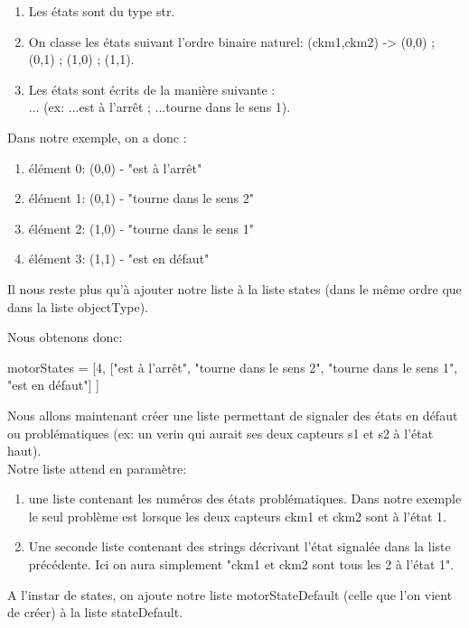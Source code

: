 {\begin{enumerate}
    \item Les états sont du type str.
    \item On classe les états suivant l'ordre binaire naturel: (ckm1,ckm2) -> (0,0) ; (0,1) ; (1,0) ; (1,1).
    \item Les états sont écrits de la manière suivante : \\
     ... (ex: ...est à l'arrêt ; ...tourne dans le sens 1).
\end{enumerate}

Dans notre exemple, on a donc : 

\begin{enumerate}
    \item élément 0: (0,0) - "est à l'arrêt"
    \item élément 1: (0,1) - "tourne dans le sens 2"
    \item élément 2: (1,0) - "tourne dans le sens 1"
    \item élément 3: (1,1) - "est en défaut"
\end{enumerate}

Il nous reste plus qu'à ajouter notre liste à la liste states (dans le même ordre que dans la liste objectType).

Nous obtenons donc:

\begin{Python}
    motorStates = [4, ["est à l'arrêt", "tourne dans le sens 2", "tourne dans le sens 1", "est en défaut"] ]
\end{Python}


Nous allons maintenant créer une liste permettant de signaler des états en défaut ou problématiques (ex: un verin qui aurait ses deux capteurs s1 et s2 à l'état haut).\\

Notre liste attend en paramètre:
\begin{enumerate}
    \item une liste contenant les numéros des états problématiques. Dans notre exemple le seul problème est lorsque les deux capteurs ckm1 et ckm2 sont à l'état 1. 
    \item Une seconde liste contenant des strings décrivant l'état signalée dans la liste précédente. Ici on aura simplement "ckm1 et ckm2 sont tous les 2 à l'état 1".
\end{enumerate}

A l'instar de states, on ajoute notre liste motorStateDefault (celle que l'on vient de créer) à la liste stateDefault.

}
